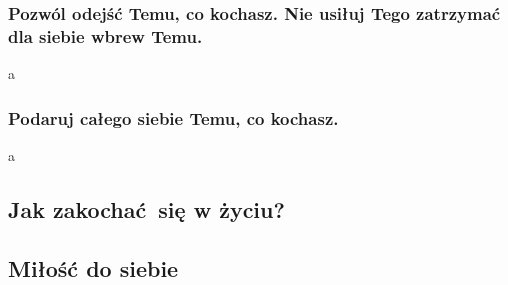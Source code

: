 \subsubsection{Pozwól odejść Temu, co kochasz. Nie usiłuj Tego zatrzymać dla siebie wbrew Temu.}
a 
\subsubsection{Podaruj całego siebie Temu, co kochasz.}
a 

\subsection{Jak zakochać się w życiu?}
\label{milosc/jak-zakochac-sie-w-zyciu}

\subsection{Miłość do siebie}
\label{milosc/milosc-do-siebie}
